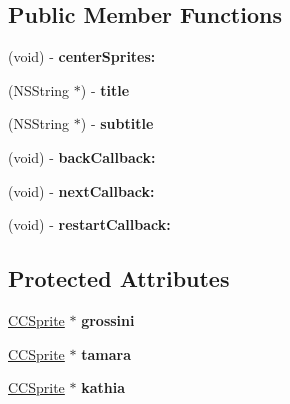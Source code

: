 \subsection*{Public Member Functions}
\begin{DoxyCompactItemize}
\item 
\hypertarget{interface_action_demo_a3588930d570d7fd63759bd4b696211b9}{(void) -\/ {\bfseries center\-Sprites\-:}}\label{interface_action_demo_a3588930d570d7fd63759bd4b696211b9}

\item 
\hypertarget{interface_action_demo_ad588d34356d03caf67f6317c21489095}{(N\-S\-String $\ast$) -\/ {\bfseries title}}\label{interface_action_demo_ad588d34356d03caf67f6317c21489095}

\item 
\hypertarget{interface_action_demo_a42ed2ac77d5b7c56943ffc3a53b8f3aa}{(N\-S\-String $\ast$) -\/ {\bfseries subtitle}}\label{interface_action_demo_a42ed2ac77d5b7c56943ffc3a53b8f3aa}

\item 
\hypertarget{interface_action_demo_a03a8ae8276e2a292b7a8818ae9765de4}{(void) -\/ {\bfseries back\-Callback\-:}}\label{interface_action_demo_a03a8ae8276e2a292b7a8818ae9765de4}

\item 
\hypertarget{interface_action_demo_ad118f0572bf30a361658465eced6974f}{(void) -\/ {\bfseries next\-Callback\-:}}\label{interface_action_demo_ad118f0572bf30a361658465eced6974f}

\item 
\hypertarget{interface_action_demo_abd34251ea2085491e16cf085709ae0cd}{(void) -\/ {\bfseries restart\-Callback\-:}}\label{interface_action_demo_abd34251ea2085491e16cf085709ae0cd}

\end{DoxyCompactItemize}
\subsection*{Protected Attributes}
\begin{DoxyCompactItemize}
\item 
\hypertarget{interface_action_demo_a6ba12eb137416e620d283a7363323517}{\hyperlink{class_c_c_sprite}{C\-C\-Sprite} $\ast$ {\bfseries grossini}}\label{interface_action_demo_a6ba12eb137416e620d283a7363323517}

\item 
\hypertarget{interface_action_demo_a6f1102be3ff409ce13bcf96c065e97c7}{\hyperlink{class_c_c_sprite}{C\-C\-Sprite} $\ast$ {\bfseries tamara}}\label{interface_action_demo_a6f1102be3ff409ce13bcf96c065e97c7}

\item 
\hypertarget{interface_action_demo_a789b689af61a6cadcf719a054e7445ee}{\hyperlink{class_c_c_sprite}{C\-C\-Sprite} $\ast$ {\bfseries kathia}}\label{interface_action_demo_a789b689af61a6cadcf719a054e7445ee}

\end{DoxyCompactItemize}


